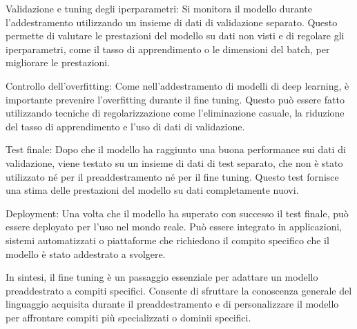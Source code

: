 Validazione e tuning degli iperparametri: Si monitora il modello durante l'addestramento utilizzando un insieme di dati di validazione separato. Questo permette di valutare le prestazioni del modello su dati non visti e di regolare gli iperparametri, come il tasso di apprendimento o le dimensioni del batch, per migliorare le prestazioni.

Controllo dell'overfitting: Come nell'addestramento di modelli di deep learning, è importante prevenire l'overfitting durante il fine tuning. Questo può essere fatto utilizzando tecniche di regolarizzazione come l'eliminazione casuale, la riduzione del tasso di apprendimento e l'uso di dati di validazione.

Test finale: Dopo che il modello ha raggiunto una buona performance sui dati di validazione, viene testato su un insieme di dati di test separato, che non è stato utilizzato né per il preaddestramento né per il fine tuning. Questo test fornisce una stima delle prestazioni del modello su dati completamente nuovi.

Deployment: Una volta che il modello ha superato con successo il test finale, può essere deployato per l'uso nel mondo reale. Può essere integrato in applicazioni, sistemi automatizzati o piattaforme che richiedono il compito specifico che il modello è stato addestrato a svolgere.

In sintesi, il fine tuning è un passaggio essenziale per adattare un modello preaddestrato a compiti specifici. Consente di sfruttare la conoscenza generale del linguaggio acquisita durante il preaddestramento e di personalizzare il modello per affrontare compiti più specializzati o dominii specifici.